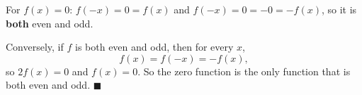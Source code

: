 For $f(x)=0$: $f(-x)=0=f(x)$ and $f(-x)=0=-0=-f(x)$, so it is \textbf{both} even and odd.

Conversely, if $f$ is both even and odd, then for every $x$,
\[f(x)=f(-x)=-f(x),\]
so $2f(x)=0$ and $f(x)=0$. So the zero function is the only function that is both even and odd. $\blacksquare$
